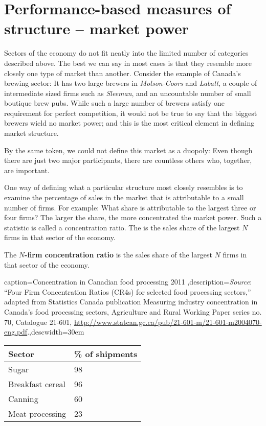\section{Performance-based measures of structure -- market power}\label{sec:ch11sec2}

Sectors of the economy do not fit neatly into the limited number of categories
described above. The best we can say in most cases is that they resemble
more closely one type of market than another. Consider the example of
Canada's brewing sector: It has two large brewers in \textit{Molson-Coors}
and \textit{Labatt}, a couple of intermediate sized firms such as 
\textit{Sleeman}, and an uncountable number of small boutique brew pubs. While such
a large number of brewers satisfy one requirement for perfect competition,
it would not be true to say that the biggest brewers wield no market power;
and this is the most critical element in defining market structure.

By the same token, we could not define this market as a duopoly: Even though
there are just two major participants, there are countless others who,
together, are important.

One way of defining what a particular structure most closely resembles is to
examine the percentage of sales in the market that is attributable to a small number
of firms. For example: What share is attributable to the largest three or
four firms? The larger the share, the more concentrated the market
power. Such a statistic is called a concentration ratio. The %
 is the sales share of the largest 
$N$ firms in that sector of the economy.

\begin{DefBox}
	The \textbf{$N$-firm concentration ratio} is the sales share of the largest $N$ firms in that sector of the economy.
\end{DefBox}

\begin{Table}{caption={Concentration in Canadian food processing 2011 \label{table:canfoodpro}},description={\textit{Source}: ``Four Firm Concentration Ratios (CR4s) for selected food processing sectors,'' adapted from Statistics Canada publication Measuring industry concentration in Canada's food processing sectors, Agriculture and Rural Working Paper series no. 70, Catalogue 21-601, \url{http://www.statcan.gc.ca/pub/21-601-m/21-601-m2004070-eng.pdf}.},descwidth={30em}}
	\begin{tabu} to 30em {|X[1,c]X[1,c]|} \hline 
			\textbf{Sector}		& \textbf{\% of shipments}	\\	\hline
		Sugar				& 98						\\
			Breakfast cereal	& 96						\\ 
		Canning				& 60						\\
			Meat processing		& 23						\\ \hline 
	\end{tabu}
\end{Table}

